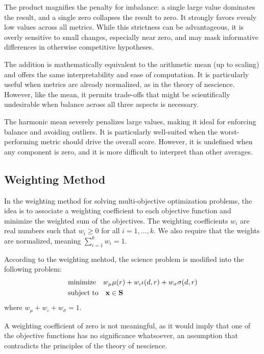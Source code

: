 The product magnifies the penalty for imbalance: a single large value dominates the result, and a single zero collapses the result to zero. It strongly favors evenly low values across all metrics. While this strictness can be advantageous, it is overly sensitive to small changes, especially near zero, and may mask informative differences in otherwise competitive hypotheses.

The addition is mathematically equivalent to the arithmetic mean (up to scaling) and offers the same interpretability and ease of computation. It is particularly useful when metrics are already normalized, as in the theory of nescience. However, like the mean, it permits trade-offs that might be scientifically undesirable when balance across all three aspects is necessary.

The harmonic mean severely penalizes large values, making it ideal for enforcing balance and avoiding outliers. It is particularly well-suited when the worst-performing metric should drive the overall score. However, it is undefined when any component is zero, and it is more difficult to interpret than other averages.


\subsection{Weighting Method}

In the weighting method for solving multi-objective optimization problems, the idea is to associate a weighting coefficient to each objective function and minimize the weighted sum of the objectives. The weighting coefficients $w_i$ are real numbers such that $w_i \geq 0$ for all $i = 1, \ldots, k$. We also require that the weights are normalized, meaning $\sum_{i=1}^k w_i = 1$.

According to the weighting mehtod, the science problem is modified into the following problem:
\begin{align*}
     & \text{minimize}    \quad w_\mu \mu(r) + w_\iota \iota(d, r) + w_\sigma \sigma(d, r) \\
     & \text{subject\;to} \quad \mathbf{x} \in \mathbf{S}
\end{align*}
where $w_\mu + w_\iota + w_\sigma = 1$.

A weighting coefficient of zero is not meaningful, as it would imply that one of the objective functions has no significance whatsoever, an assumption that contradicts the principles of the theory of nescience.

